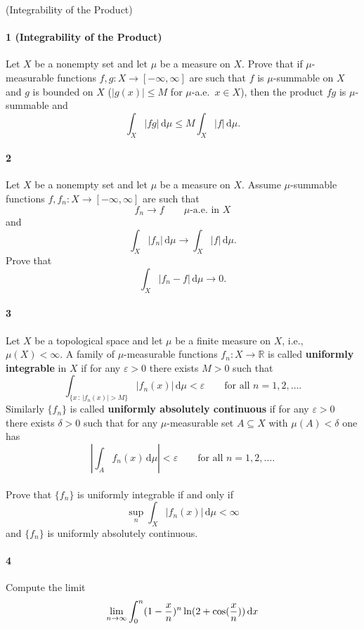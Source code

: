 \documentclass[12pt]{article}
\newlength{\myparskip}
\newenvironment{fullbox}{\begin{lrbox}{\savefullbox}\begin{minipage}{\dimexpr\textwidth-2\fboxsep\relax}\setlength{\parskip}{\myparskip}}{\end{minipage}\end{lrbox}\framebox[\textwidth]{\usebox{\savefullbox}}}
\newenvironment{pbox}[1][]{\begin{fullbox}\ifx#1\empty\else\paragraph{#1}\phantom{}\fi}{\end{fullbox}}
\theoremstyle{definition}
\newcommand{\R}{\mathbb{R}}
\newcommand{\eps}{\varepsilon}
\newcommand{\<}{\langle}
\renewcommand{\>}{\rangle}
\newcommand{\qty}[2][0]{
    \ifnum #1=0 (#2) \fi
    \ifnum #1=1 \big(#2\big) \fi
    \ifnum #1=2 \Big(#2\Big) \fi
    \ifnum #1=3 \bigg(#2\bigg) \fi
    \ifnum #1=4 \Bigg(#2\Bigg) \fi
}
\newcommand{\dd}{\,\mathrm{d}}
\newcommand{\dto}{\longrightarrow}
\newcommand{\abs}[1]{\left|#1\right|}
\newcommand{\pfrac}[2]{\qty{\frac{#1}{#2}}}
\begin{document}
\begin{pbox}[1 (Integrability of the Product)]
    Let $X$ be a nonempty set and let $\mu$ be a measure on $X$.
    Prove that if $\mu$-measurable functions $f, g : X \to [-\infty, \infty]$ are such that $f$ is $\mu$-summable on $X$ and $g$ is bounded on $X$ ($|g(x)| \leq M$ for $\mu$-a.e.\ $x \in X$), then the product $fg$ is $\mu$-summable and
    \[
        \int_X |fg| \dd\mu \leq M \int_X |f| \dd\mu.
    \]
\end{pbox}

\begin{pbox}[2]
    Let $X$ be a nonempty set and let $\mu$ be a measure on $X$.
    Assume $\mu$-summable functions $f, f_n : X \to [-\infty, \infty]$ are such that
    \[
        f_n \dto f \qquad \text{$\mu$-a.e.\ in $X$}
    \]
    and
    \[
        \int_X |f_n| \dd\mu \dto \int_X |f| \dd\mu.
    \]
    Prove that
    \[
        \int_X |f_n - f| \dd\mu \dto 0.
    \]
\end{pbox}

\begin{pbox}[3]
    Let $X$ be a topological space and let $\mu$ be a finite measure on $X$, i.e., $\mu(X) < \infty$.
    A family of $\mu$-measurable functions $f_n : X \to \R$ is called \textbf{uniformly integrable} in $X$ if for any $\eps > 0$ there exists $M > 0$ such that
    \[
        \int_{\{x \,:\, |f_n(x)| > M\}} |f_n(x)| \dd\mu < \eps \qquad\text{for all } n = 1, 2, \dots.
    \]
    Similarly $\{f_n\}$ is called \textbf{uniformly absolutely continuous} if for any $\eps > 0$ there exists $\delta > 0$ such that for any $\mu$-measurable set $A \subseteq X$ with $\mu(A) < \delta$ one has
    \[
        \abs{\int_A f_n(x) \dd\mu} < \eps \qquad\text{for all } n = 1, 2, \dots.
    \]
\end{pbox}

\begin{pbox}
    Prove that $\{f_n\}$ is uniformly integrable if and only if
    \[
        \sup_{n} \int_X |f_n(x)| \dd\mu < \infty
    \]
    and $\{f_n\}$ is uniformly absolutely continuous.
\end{pbox}

\begin{pbox}[4]
    Compute the limit
    \[
        \lim_{n \to \infty} \int_{0}^{n} \qty{1 - \frac{x}{n}}^n \ln\qty{2 + \cos\pfrac{x}{n}} \dd{x} 
    \]
\end{pbox}
\end{document}
